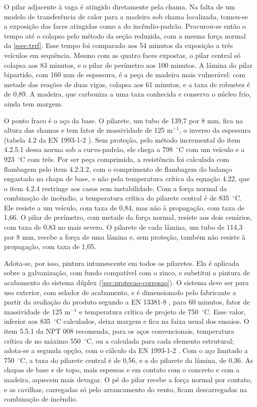 O pilar adjacente à vaga é atingido diretamente pela chama. Na falta de um
modelo de transferência de calor para a madeira sob chama localizada, tomou-se a
exposição das faces atingidas como a do incêndio-padrão. Procurou-se então o tempo
até o colapso pelo método da seção reduzida, com a mesma força normal da
\autoref{ssec:trrf}. Esse tempo foi comparado aos 54 minutos da exposição a três veículos em
sequência. Mesmo com as
quatro faces expostas, o pilar central só colapsa aos 83 minutos, e o pilar de
perímetro aos 100 minutos. A lâmina do pilar bipartido, com 160 mm de espessura,
é a peça de madeira mais vulnerável: com metade das reações de duas vigas, colapsa
aos 61 minutos, e a taxa de robustez é de 0,89. A madeira, que carboniza a uma taxa
conhecida e conserva o núcleo frio, ainda tem margem.

O ponto fraco é o aço da base. O pilarete, um tubo de 139,7 por 8 mm, fica na
altura das chamas e tem fator de massividade de 125 m$^{-1}$, o inverso da
espessura (tabela 4.2 da EN 1993-1-2 \cite{EN1993-1-2:2005}). Sem proteção, pelo
método incremental do item 4.2.5.1 dessa norma sob a curva-padrão, ele chega a
798~$^{\circ}$C com um veículo e a 923~$^{\circ}$C com três. Por ser peça comprimida, a
resistência foi calculada com flambagem pelo item 4.2.3.2, com o comprimento de
flambagem do balanço engastado na chapa de base, e não pela temperatura crítica
da equação 4.22, que o item 4.2.4 restringe aos casos sem instabilidade. Com a
força normal da combinação de incêndio, a temperatura crítica do pilarete
central é de 835~$^{\circ}$C. Ele resiste a um veículo, com taxa de 0,84, mas não à
propagação, com taxa de 1,66. O pilar de perímetro, com metade da força normal,
resiste aos dois cenários, com taxa de 0,83 no mais severo. O pilarete de cada
lâmina, um tubo de 114,3 por 8 mm, recebe a força de uma lâmina e, sem proteção,
também não resiste à propagação, com taxa de 1,05.

Adota-se, por isso, pintura intumescente em todos os pilaretes. Ela é aplicada
sobre a galvanização, com fundo compatível com o zinco, e substitui a pintura de
acabamento do sistema dúplex (\autoref{sec:protecao-corrosao}). O sistema deve
ser para uso exterior, com selador de acabamento, e é dimensionado pelo fabricante
a partir da avaliação do produto segundo a EN 13381-8 \cite{EN13381-8:2013}, para
60 minutos, fator de massividade de 125 m$^{-1}$ e temperatura crítica de projeto
de 750~$^{\circ}$C. Esse valor, inferior aos 835~$^{\circ}$C calculados, deixa margem e
fica na faixa usual dos ensaios. O item 5.5.1 da NPT 008 recomenda, para os aços
convencionais, temperatura crítica de no máximo 550~$^{\circ}$C, ou a calculada
para cada elemento estrutural; adota-se a segunda opção, com o cálculo da
EN 1993-1-2 \cite{EN1993-1-2:2005}. Com o aço limitado a 750~$^{\circ}$C, a taxa do
pilarete central é de 0,56, e a do pilarete da lâmina, de 0,36. As chapas de base e de topo, mais espessas e em contato
com o concreto e com a madeira, aquecem mais devagar. O pé do pilar recebe a força
normal por contato, e as cavilhas, carregadas só pelo arrancamento do vento, ficam
descarregadas na combinação de incêndio.

